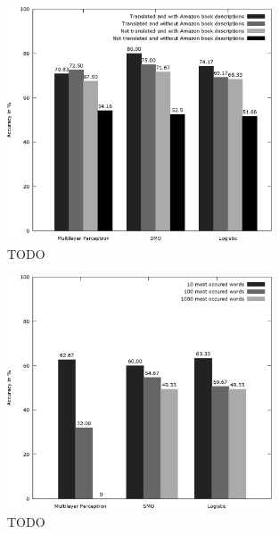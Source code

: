 \begin{figure}
	\label{fig:product_translate_amazon_without_none}
	\begin{center}
		\includegraphics[width=0.7\textwidth]{figures/product_translate_amazon_without_none.eps}
	\end{center}
	\caption{TODO}
\end{figure}

\begin{figure}
	\label{fig:product_feature_selection_with_none}
	\begin{center}
		\includegraphics[width=0.7\textwidth]{figures/product_feature_selection_with_none.eps}
	\end{center}
	\caption{TODO}
\end{figure}

